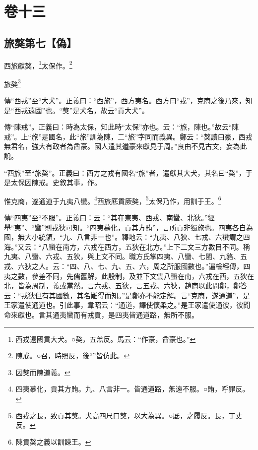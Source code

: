 

\chapter{卷十三}


\section{旅獒第七【偽】}


西旅獻獒，\footnote{西戎遠國貢大犬。○獒，五羔反。馬云：“作豪，酋豪也。”}太保作。\footnote{陳戒。○召，時照反，後“”皆仿此。}

旅獒\footnote{因獒而陳道義。}


{\noindent\zhuan{}\fzbyks 傳“西戎”至“大犬”。正義曰：“西旅”，西方夷名。西方曰“戎”，克商之後乃來，知是“西戎遠國”也。“獒”是犬名，故云“貢大犬”。 \par}

{\noindent\zhuan{}\fzbyks 傳“陳戒”。正義曰：時為太保，知此時“太保”亦也。云：“旅，陳也。”故云“陳戒”。上“旅”是國名，此“旅”訓為陳，二“旅”字同而義異。鄭云：“獒讀曰豪，西戎無君名，強大有政者為酋豪。國人遣其遒豪來獻見于周。”良由不見古文，妄為此說。 \par}

{\noindent\shu{}\fzkt “西旅”至“旅獒”。正義曰：西方之戎有國名“旅”者，遣獻其大犬，其名曰“獒”，于是太保因陳戒。史敘其事，作。 \par}

惟克商，遂通道于九夷八蠻。\footnote{四夷慕化，貢其方賄。九、八言非一。皆通道路，無遠不服。○賄，呼罪反。}西旅厎貢厥獒，\footnote{西戎之長，致貢其獒。犬高四尺曰獒，以大為異。○厎，之履反。長，丁丈反。}太保乃作，用訓于王。\footnote{陳貢獒之義以訓諫王。}


{\noindent\zhuan{}\fzbyks 傳“四夷”至“不服”。正義曰：云：“其在東夷、西戎、南蠻、北狄。”經舉“夷”、“蠻”則戎狄可知。“四夷慕化，貢其方賄”，言所貢非獨旅也。四夷各自為國，無大小統領，“九、八言非一也”。釋地云：“九夷、八狄、七戎、六蠻謂之四海。”又云：“八蠻在南方，六戎在西方，五狄在北方。”上下二文三方數目不同。稱九夷、八蠻、六戎、五狄，與上文不同。職方氏掌四夷、八蠻、七閩、九貉、五戎、六狄之人。云：“四、八、七、九、五、六，周之所服國數也。”遍檢經傳，四夷之數，參差不同，先儒舊解，此殷制，及並下文雲八蠻在南，六戎在西，五狄在北，皆為周制，義或當然。言六戎、五狄，言五戎、六狄，趙商以此問鄭，鄭答云：“戎狄但有其國數，其名難得而知。”是鄭亦不能定解。言“克商，遂通道”，是王家遣使通道也。引此事，韋昭云：“通道，譯使懷柔之。”是王家遣使通彼，彼聞命來獻也。言其通夷蠻而有戎貢，是四夷皆通道路，無所不服。 \par}


